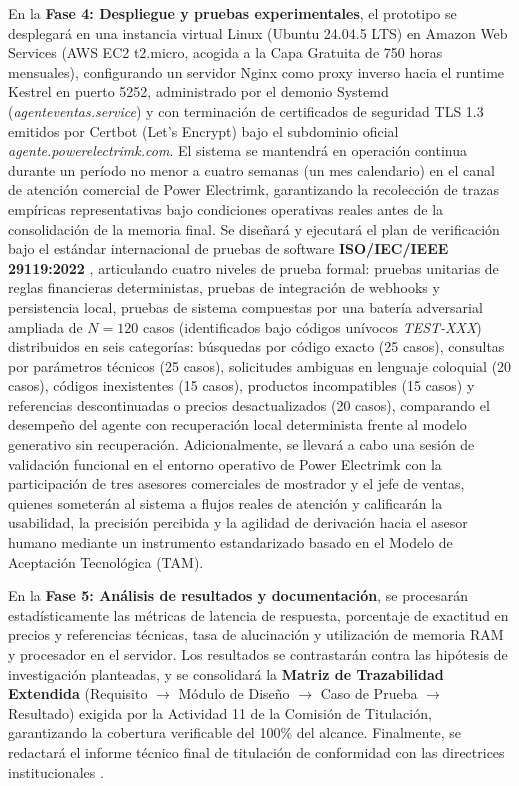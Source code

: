 En la \textbf{Fase 4: Despliegue y pruebas experimentales}, el prototipo se desplegará en una instancia virtual Linux (Ubuntu 24.04.5 LTS) en Amazon Web Services (AWS EC2 t2.micro, acogida a la Capa Gratuita de 750 horas mensuales), configurando un servidor Nginx como proxy inverso hacia el runtime Kestrel en puerto 5252, administrado por el demonio Systemd (\textit{agenteventas.service}) y con terminación de certificados de seguridad TLS 1.3 emitidos por Certbot (Let's Encrypt) bajo el subdominio oficial \textit{agente.powerelectrimk.com}. El sistema se mantendrá en operación continua durante un período no menor a cuatro semanas (un mes calendario) en el canal de atención comercial de Power Electrimk, garantizando la recolección de trazas empíricas representativas bajo condiciones operativas reales antes de la consolidación de la memoria final. Se diseñará y ejecutará el plan de verificación bajo el estándar internacional de pruebas de software \textbf{ISO/IEC/IEEE 29119:2022} \parencite{iso29119}, articulando cuatro niveles de prueba formal: pruebas unitarias de reglas financieras deterministas, pruebas de integración de webhooks y persistencia local, pruebas de sistema compuestas por una batería adversarial ampliada de $N = 120$ casos (identificados bajo códigos unívocos \textit{TEST-XXX}) distribuidos en seis categorías: búsquedas por código exacto (25 casos), consultas por parámetros técnicos (25 casos), solicitudes ambiguas en lenguaje coloquial (20 casos), códigos inexistentes (15 casos), productos incompatibles (15 casos) y referencias descontinuadas o precios desactualizados (20 casos), comparando el desempeño del agente con recuperación local determinista frente al modelo generativo sin recuperación. Adicionalmente, se llevará a cabo una sesión de validación funcional en el entorno operativo de Power Electrimk con la participación de tres asesores comerciales de mostrador y el jefe de ventas, quienes someterán al sistema a flujos reales de atención y calificarán la usabilidad, la precisión percibida y la agilidad de derivación hacia el asesor humano mediante un instrumento estandarizado basado en el Modelo de Aceptación Tecnológica (TAM).

En la \textbf{Fase 5: Análisis de resultados y documentación}, se procesarán estadísticamente las métricas de latencia de respuesta, porcentaje de exactitud en precios y referencias técnicas, tasa de alucinación y utilización de memoria RAM y procesador en el servidor. Los resultados se contrastarán contra las hipótesis de investigación planteadas, y se consolidará la \textbf{Matriz de Trazabilidad Extendida} (Requisito $\rightarrow$ Módulo de Diseño $\rightarrow$ Caso de Prueba $\rightarrow$ Resultado) exigida por la Actividad 11 de la Comisión de Titulación, garantizando la cobertura verificable del 100\% del alcance. Finalmente, se redactará el informe técnico final de titulación de conformidad con las directrices institucionales \parencite{10.1007/978-3-031-98890-5_3}.

